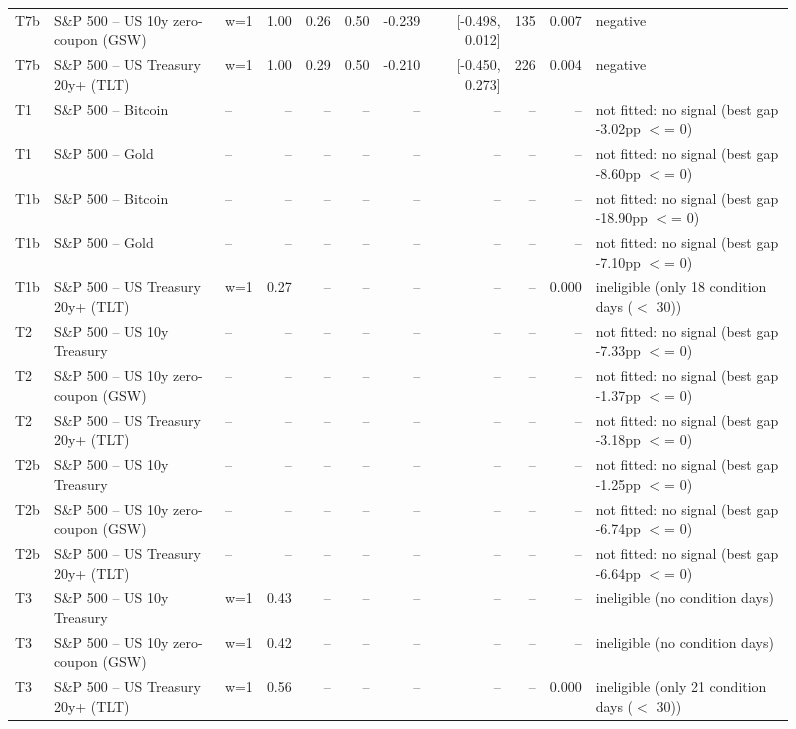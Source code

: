 \begin{figure}
\begin{tabular}{lllrrrrrrrl}
T7b & S\&P 500 -- US 10y zero-coupon (GSW) & w=1 & 1.00 & 0.26 & 0.50 & -0.239 & [-0.498, 0.012] & 135 & 0.007 & negative \\
T7b & S\&P 500 -- US Treasury 20y+ (TLT) & w=1 & 1.00 & 0.29 & 0.50 & -0.210 & [-0.450, 0.273] & 226 & 0.004 & negative \\
T1 & S\&P 500 -- Bitcoin & -- & -- & -- & -- & -- & -- & -- & -- & not fitted: no signal (best gap -3.02pp $<$= 0) \\
T1 & S\&P 500 -- Gold & -- & -- & -- & -- & -- & -- & -- & -- & not fitted: no signal (best gap -8.60pp $<$= 0) \\
T1b & S\&P 500 -- Bitcoin & -- & -- & -- & -- & -- & -- & -- & -- & not fitted: no signal (best gap -18.90pp $<$= 0) \\
T1b & S\&P 500 -- Gold & -- & -- & -- & -- & -- & -- & -- & -- & not fitted: no signal (best gap -7.10pp $<$= 0) \\
T1b & S\&P 500 -- US Treasury 20y+ (TLT) & w=1 & 0.27 & -- & -- & -- & -- & -- & 0.000 & ineligible (only 18 condition days ($<$ 30)) \\
T2 & S\&P 500 -- US 10y Treasury & -- & -- & -- & -- & -- & -- & -- & -- & not fitted: no signal (best gap -7.33pp $<$= 0) \\
T2 & S\&P 500 -- US 10y zero-coupon (GSW) & -- & -- & -- & -- & -- & -- & -- & -- & not fitted: no signal (best gap -1.37pp $<$= 0) \\
T2 & S\&P 500 -- US Treasury 20y+ (TLT) & -- & -- & -- & -- & -- & -- & -- & -- & not fitted: no signal (best gap -3.18pp $<$= 0) \\
T2b & S\&P 500 -- US 10y Treasury & -- & -- & -- & -- & -- & -- & -- & -- & not fitted: no signal (best gap -1.25pp $<$= 0) \\
T2b & S\&P 500 -- US 10y zero-coupon (GSW) & -- & -- & -- & -- & -- & -- & -- & -- & not fitted: no signal (best gap -6.74pp $<$= 0) \\
T2b & S\&P 500 -- US Treasury 20y+ (TLT) & -- & -- & -- & -- & -- & -- & -- & -- & not fitted: no signal (best gap -6.64pp $<$= 0) \\
T3 & S\&P 500 -- US 10y Treasury & w=1 & 0.43 & -- & -- & -- & -- & -- & -- & ineligible (no condition days) \\
T3 & S\&P 500 -- US 10y zero-coupon (GSW) & w=1 & 0.42 & -- & -- & -- & -- & -- & -- & ineligible (no condition days) \\
T3 & S\&P 500 -- US Treasury 20y+ (TLT) & w=1 & 0.56 & -- & -- & -- & -- & -- & 0.000 & ineligible (only 21 condition days ($<$ 30)) \\

\end{tabular}
\end{figure}
